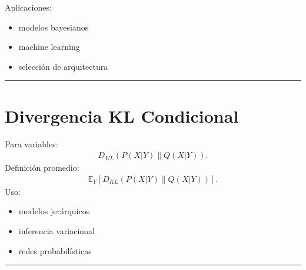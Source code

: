 \documentclass[letterpaper,10pt,english]{jupyterBook}
\begin{document}
\sphinxAtStartPar
Aplicaciones:
\begin{itemize}
\item {} 
\sphinxAtStartPar
modelos bayesianos

\item {} 
\sphinxAtStartPar
machine learning

\item {} 
\sphinxAtStartPar
selección de arquitectura

\end{itemize}


\bigskip\hrule\bigskip



\section{Divergencia KL Condicional}
\label{\detokenize{02_mathematical_foundations/kl_divergence:divergencia-kl-condicional}}
\sphinxAtStartPar
Para variables:
\begin{equation*}
\begin{split}
D_{KL}(P(X|Y)\|Q(X|Y)).
\end{split}
\end{equation*}
\sphinxAtStartPar
Definición promedio:
\begin{equation*}
\begin{split}
\mathbb{E}_Y
\left[
D_{KL}(P(X|Y)\|Q(X|Y))
\right].
\end{split}
\end{equation*}
\sphinxAtStartPar
Uso:
\begin{itemize}
\item {} 
\sphinxAtStartPar
modelos jerárquicos

\item {} 
\sphinxAtStartPar
inferencia variacional

\item {} 
\sphinxAtStartPar
redes probabilísticas

\end{itemize}


\bigskip\hrule\bigskip
\end{document}
